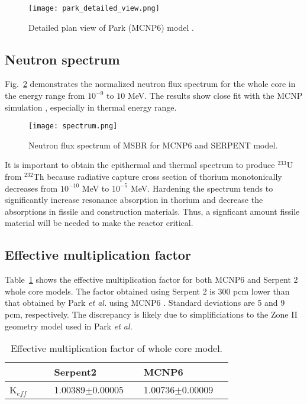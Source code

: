 \begin{figure}[htp!] %
  \centering
  \vspace{-0.3em}
  \texttt{[image: park\_detailed\_view.png]}
  \caption{Detailed plan view of Park (MCNP6) model \cite{park_whole_2015}.}
  \vspace{-0.6em}
  \label{fig:park_detailed_view}
\end{figure}
 	
\subsection{Neutron spectrum}
Fig.~\ref{fig:spectrum} demonstrates the normalized neutron flux spectrum for 
the whole core in the energy range from $10^{-9}$ to $10$ MeV. The results show 
close fit with the MCNP simulation \cite{park_whole_2015}, especially in 
thermal energy range.  
\begin{figure}[t!] %
  \centering
  \texttt{[image: spectrum.png]} \caption{Neutron flux 
  spectrum of \gls{MSBR} for MCNP6 and SERPENT model.}
  \label{fig:spectrum}
\end{figure}
It is important to obtain the epithermal and thermal spectrum to produce 
$^{233}$U from $^{232}$Th because radiative capture cross section of thorium 
monotonically decreases from $10^{-10}$ MeV to $10^{-5}$ MeV. Hardening the 
spectrum tends to significantly increase resonance absorption in thorium and 
decrease the absorptions in fissile and construction materials. Thus, a 
signficant amount fissile material will be needed to make the reactor critical.

\subsection{Effective multiplication factor}
Table~\ref{tab:keff} shows the effective multiplication factor for both MCNP6 
and Serpent 2 whole core models. The factor obtained using Serpent 2 is 300 pcm 
lower than that obtained by Park \emph{et al.} using MCNP6 
\cite{park_whole_2015}. Standard deviations are 5 and 9 pcm, respectively. The 
discrepancy is likely due to simplificiations to the Zone II geometry model 
used in Park \emph{et al.}
\captionsetup[table]{
  labelsep = newline,
  name = TABLE, justification=justified,
  singlelinecheck=false,%
  labelsep=colon,%
  skip = \medskipamount}
\begin{table}[h!]
\caption{Effective multiplication factor of whole core model.}
\begin{tabular}{p{0.15\linewidth} p{0.3\linewidth} p{0.3\linewidth}} \toprule
      & Serpent2      & MCNP6 \cite{park_whole_2015}          \\ \midrule
K$_{eff}$  & 1.00389$\pm$0.00005 & 1.00736$\pm$0.00009
\\
\bottomrule
\end{tabular}
  \label{tab:keff}
\end{table}
